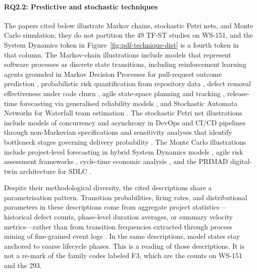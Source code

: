 \paragraph{RQ2.2: Predictive and stochastic techniques} The papers cited below illustrate Markov chains, stochastic Petri nets, and
Monte Carlo simulation; they do not partition the 49 TF-ST studies on
WS-151, and the System Dynamics token in
Figure~\ref{fig:pdf-technique-dist} is a fourth token in that column.
The Markov-chain illustrations include
models that represent software processes as discrete state transitions, including
reinforcement learning agents grounded in Markov Decision Processes for
pull-request outcome prediction \cite{joshi2024}, probabilistic risk
quantification from repository data \cite{jeon2015}, defect removal
effectiveness under code churn \cite{tian2005}, agile state-space planning and
tracking \cite{tyagi2021}, release-time forecasting via generalised reliability
models \cite{washizaki2015}, and Stochastic Automata Networks for Waterfall team
estimation \cite{massitela2018}. The stochastic Petri net illustrations
include models of concurrency and asynchrony in DevOps and CI/CD pipelines
through non-Markovian specifications \cite{benmesmia2021} and sensitivity
analyses that identify bottleneck stages governing delivery probability
\cite{bhadra2022,bhadra2023}. The Monte Carlo illustrations
include project-level forecasting in hybrid System Dynamics models
\cite{li2020}, agile risk assessment frameworks \cite{lunesu2021}, cycle-time
economic analysis \cite{magennis2015}, and the PRIMAD digital-twin architecture
for SDLC \cite{guinea2025}.

Despite their methodological diversity, the cited descriptions share a
parametrisation pattern. Transition
probabilities, firing rates, and distributional parameters in these
descriptions come from aggregate project statistics---historical defect
counts, phase-level duration averages, or summary velocity metrics---rather
than from transition frequencies extracted through process mining of
fine-grained event logs \cite{nafreen2020,bhadra2022,li2020}. In the same
descriptions, model states stay anchored to coarse lifecycle phases. This
is a reading of those descriptions. It is not a re-mark of the family codes
labeled F3, which are the counts on WS-151 and the 293.

